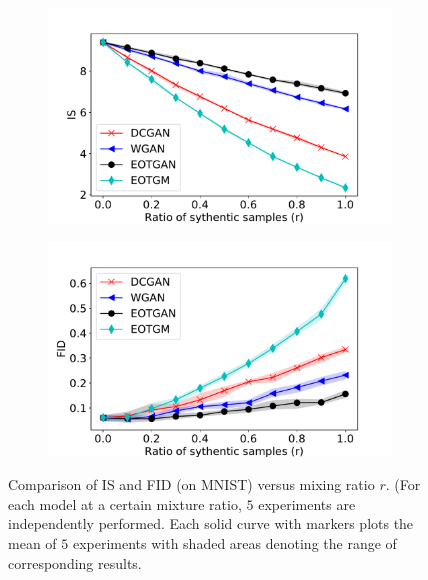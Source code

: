 \begin{figure}[!t]
  \centering
  \begin{subfigure}[b]{0.44\textwidth}
    \centering
    \includegraphics[width=1.1\linewidth]{images/mnist/tra_score/IS_29.pdf}\vspace{-3pt}
    \caption{}
    \label{fig-tra-is}
  \end{subfigure}
  \begin{subfigure}[b]{0.44\textwidth}
    \centering
    \includegraphics[width=1.1\linewidth]{images/mnist/tra_score/FID_29.pdf}\vspace{-3pt}
    \caption{}
    \label{fig-tra-fid}
  \end{subfigure}
  \caption{Comparison of IS and FID (on MNIST) versus mixing ratio $r$. (For each model at a certain mixture ratio, $5$ experiments are independently performed. Each solid curve with markers plots the mean of $5$ experiments with shaded areas denoting the range of corresponding results.}
  \label{fig-tra-score}
\end{figure}


